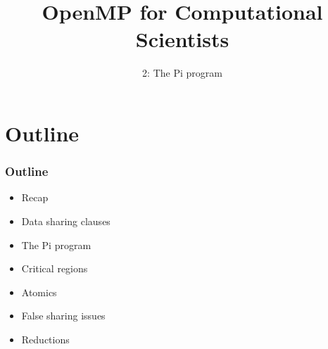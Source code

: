 \documentclass{beamer}
\title{OpenMP for Computational Scientists}
\subtitle{2: The Pi program}
\begin{document}
\frame{\titlepage}


\section{Outline}
\begin{frame}
\frametitle{Outline}
\begin{itemize}
  \item Recap
  \item Data sharing clauses
  \item The Pi program
  \item Critical regions
  \item Atomics
  \item False sharing issues
  \item Reductions
\end{itemize}
\end{frame}
\end{document}
